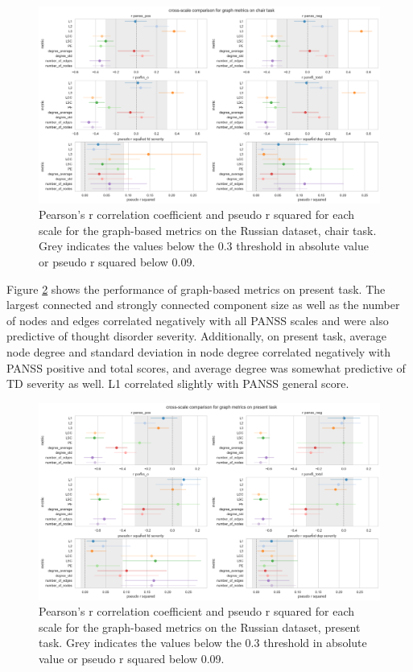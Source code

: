 \begin{figure}[ht!]
    \includegraphics[width=1.1\textwidth, center]{Figures/chapter_4/graph/ru_chair_scale_r.png} 
\captionsetup{width=\textwidth}
\caption[Graph Metrics: Russian, Chair Task]{\label{fig:results:graph:ru:ch} Pearson's r correlation coefficient and pseudo r squared for each scale for the graph-based metrics on the Russian dataset, chair task. Grey indicates the values below the 0.3 threshold in absolute value or pseudo r squared below 0.09.}
\end{figure}

\clearpage
Figure \ref{fig:results:graph:ru:pr} shows the performance of graph-based metrics on present task. The largest connected and strongly connected component size as well as the number of nodes and edges correlated negatively with all PANSS scales and were also predictive of thought disorder severity. Additionally, on present task, average node degree and standard deviation in node degree correlated negatively with PANSS positive and total scores, and average degree was somewhat predictive of TD severity as well.  L1 correlated slightly with PANSS general score.

\begin{figure}[ht!]
    \includegraphics[width=1.1\textwidth, center]{Figures/chapter_4/graph/ru_present_scale_r.png} 
\captionsetup{width=\textwidth}
\caption[Graph Metrics: Russian, Present Task]{\label{fig:results:graph:ru:pr} Pearson's r correlation coefficient and pseudo r squared for each scale for the graph-based metrics on the Russian dataset, present task. Grey indicates the values below the 0.3 threshold in absolute value or pseudo r squared below 0.09.}
\end{figure}

